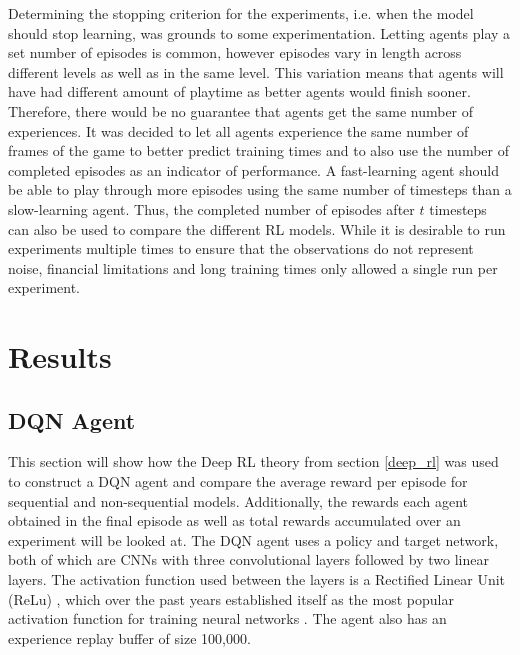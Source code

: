 \documentclass[notitlepage,a4paper,11pt]{article}
\begin{document}
Determining the stopping criterion for the experiments, i.e. when the model should stop learning, was grounds to some experimentation. Letting agents play a set number of episodes is common, however episodes vary in length across different levels as well as in the same level. This variation means that agents will have had different amount of playtime as better agents would finish sooner. Therefore, there would be no guarantee that agents get the same number of experiences. It was decided to let all agents experience the same number of frames of the game to better predict training times and to also use the number of completed episodes as an indicator of performance. A fast-learning agent should be able to play through more episodes using the same number of timesteps than a slow-learning agent. Thus, the completed number of episodes after $t$ timesteps can also be used to compare the different RL models. While it is desirable to run experiments multiple times to ensure that the observations do not represent noise, financial limitations and long training times only allowed a single run per experiment. 



\section{Results}

\subsection{DQN Agent}\label{dqn_experiment}
This section will show how the Deep RL theory from section \ref{deep_rl} was used to construct a DQN agent and compare the average reward per episode for sequential and non-sequential models. Additionally, the rewards each agent obtained in the final episode as well as total rewards accumulated over an experiment will be looked at. The DQN agent uses a policy and target network, both of which are CNNs with three convolutional layers followed by two linear layers. The activation function used between the layers is a Rectified Linear Unit (ReLu) \cite{lecun2015deep}, which over the past years established itself as the most popular activation function for training neural networks \cite{ramachandran2017searching}. The agent also has an experience replay buffer of size 100,000. 
\end{document}
